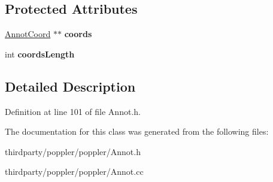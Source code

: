 \subsection*{Protected Attributes}
\begin{DoxyCompactItemize}
\item 
\mbox{\label{class_annot_path_afa865343e3eda39b3c763cf07c09a363}} 
\hyperlink{class_annot_coord}{Annot\+Coord} $\ast$$\ast$ {\bfseries coords}
\item 
\mbox{\label{class_annot_path_ac12ea1aab1c2b5fe9a0bb590089e2214}} 
int {\bfseries coords\+Length}
\end{DoxyCompactItemize}


\subsection{Detailed Description}


Definition at line 101 of file Annot.\+h.



The documentation for this class was generated from the following files\+:\begin{DoxyCompactItemize}
\item 
thirdparty/poppler/poppler/Annot.\+h\item 
thirdparty/poppler/poppler/Annot.\+cc\end{DoxyCompactItemize}
